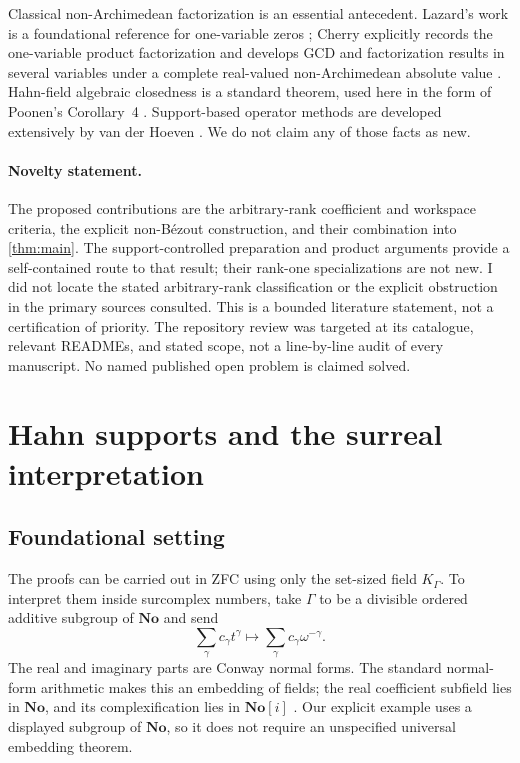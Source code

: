 \documentclass[11pt]{article}
\theoremstyle{plain}
\theoremstyle{plain}
\theoremstyle{plain}
\theoremstyle{definition}
\theoremstyle{definition}
\theoremstyle{definition}
\theoremstyle{remark}
\newcommand{\No}{\mathbf{No}}
\newcommand{\K}{K_\Gamma}\newcommand{\E}{\mathcal E_\Gamma}
\begin{document}
Classical non-Archimedean factorization is an essential antecedent.
Lazard's work is a foundational reference for one-variable zeros
\cite{Lazard}; Cherry explicitly records the one-variable product
factorization and develops GCD and factorization results in several
variables under a complete real-valued non-Archimedean absolute value
\cite{Cherry}. Hahn-field algebraic closedness is a standard theorem,
used here in the form of Poonen's Corollary~4 \cite{Poonen}.
Support-based operator methods are developed extensively by van der
Hoeven \cite{vdH}. We do not claim any of those facts as new.

\paragraph{Novelty statement.}
The proposed contributions are the arbitrary-rank coefficient and
workspace criteria, the explicit non-B\'ezout construction, and their
combination into \cref{thm:main}. The support-controlled preparation and
product arguments provide a self-contained route to that result; their
rank-one specializations are not new. I did not locate the stated
arbitrary-rank classification or the explicit obstruction in the primary
sources consulted. This is a bounded literature statement, not a
certification of priority. The repository review was targeted at its
catalogue, relevant READMEs, and stated scope, not a line-by-line audit
of every manuscript. No named published open problem is claimed solved.

\section{Hahn supports and the surreal interpretation}
\label{sec:support}

\subsection{Foundational setting}
The proofs can be carried out in ZFC using only the set-sized field
$\K$. To interpret them inside surcomplex numbers, take $\Gamma$ to be
a divisible ordered additive subgroup of $\No$ and send
\begin{equation}\label{eq:embedding}
 \sum_\gamma c_\gamma t^\gamma
 \longmapsto \sum_\gamma c_\gamma\omega^{-\gamma}.
\end{equation}
The real and imaginary parts are Conway normal forms. The standard
normal-form arithmetic makes this an embedding of fields; the real
coefficient subfield lies in $\No$, and its complexification lies in
$\No[i]$ \cite{Conway,Gonshor}. Our explicit example uses a displayed
subgroup of $\No$, so it does not require an unspecified universal
embedding theorem.
\end{document}

